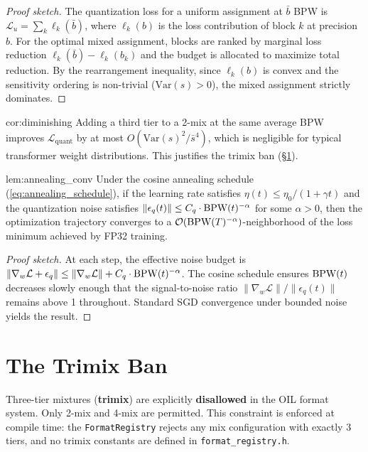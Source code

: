 \begin{proof}[Proof sketch]
The quantization loss for a uniform assignment at $\bar{b}$ BPW is
$\mathcal{L}_u = \sum_k \ell_k(\bar{b})$, where $\ell_k(b)$ is the
loss contribution of block $k$ at precision $b$.  For the optimal mixed
assignment, blocks are ranked by marginal loss reduction
$\ell_k(\bar{b}) - \ell_k(b_k)$ and the budget is allocated to
maximize total reduction.  By the rearrangement inequality, since
$\ell_k(b)$ is convex and the sensitivity ordering is non-trivial
($\text{Var}(s) > 0$), the mixed assignment strictly dominates.
\end{proof}

\begin{mycor}{cor:diminishing}
Adding a third tier to a 2-mix at the same average BPW improves
$\mathcal{L}_{\text{quant}}$ by at most $O(\text{Var}(s)^2 /
\bar{s}^4)$, which is negligible for typical transformer weight
distributions.  This justifies the trimix ban
(\S\ref{sec:trimix_ban}).
\end{mycor}

\begin{mylemma}{lem:annealing_conv}
Under the cosine annealing schedule (\ref{eq:annealing_schedule}), if
the learning rate satisfies $\eta(t) \leq \eta_0 / (1 + \gamma t)$ and
the quantization noise satisfies
$\|\epsilon_q(t)\| \leq C_q \cdot \textnormal{BPW}(t)^{-\alpha}$ for some
$\alpha > 0$, then the optimization trajectory converges to a
$\mathcal{O}(\textnormal{BPW}(T)^{-\alpha})$-neighborhood of the loss minimum
achieved by FP32 training.
\end{mylemma}

\begin{proof}[Proof sketch]
At each step, the effective noise budget is
$\|\nabla_w \mathcal{L} + \epsilon_q\| \leq
\|\nabla_w \mathcal{L}\| + C_q \cdot \textnormal{BPW}(t)^{-\alpha}$.
The cosine schedule ensures $\textnormal{BPW}(t)$ decreases slowly enough that the
signal-to-noise ratio $\|\nabla_w \mathcal{L}\| /
\|\epsilon_q(t)\|$ remains above 1 throughout.  Standard SGD
convergence under bounded noise yields the result.
\end{proof}

\section{The Trimix Ban}
\label{sec:trimix_ban}

Three-tier mixtures (\textbf{trimix}) are explicitly \textbf{disallowed}
in the OIL format system.  Only 2-mix and 4-mix are permitted.  This
constraint is enforced at compile time: the \texttt{FormatRegistry}
rejects any mix configuration with exactly 3 tiers, and no trimix
constants are defined in \texttt{format\_registry.h}.


